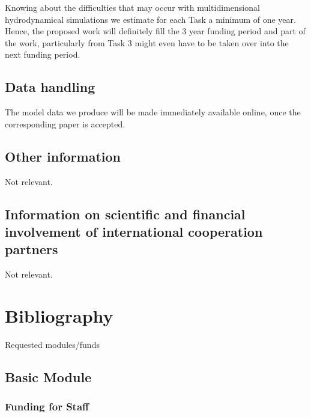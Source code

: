 \documentclass[10pt,fleqn,twoside]{article}
\begin{document}
Knowing about the difficulties that may occur with multidimensional hydrodynamical simulations we estimate
for each Task a minimum of one year. Hence, the proposed work will definitely fill the 3 year funding period
and part of the work, particularly from Task 3 might even have to be taken over into the next 
funding period.



\subsection{Data handling}
The model data we produce will be made immediately available online, once
the corresponding paper is accepted. 

\subsection{Other information}
Not relevant.

\subsection{Information on scientific and financial involvement of international cooperation partners}
Not relevant.

\section{Bibliography}

\begingroup
\renewcommand{\section}[2]{}%
%


\endgroup


\section{Requested modules/funds}
\renewcommand{\leftmark}{\sc Requested modules/funds}

\subsection{Basic Module}

\subsubsection{Funding for Staff}
\end{document}
